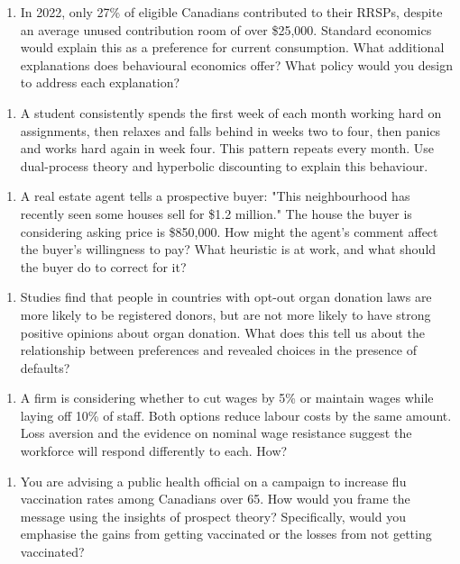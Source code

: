 \documentclass[12pt, letterpaper]{article}
\begin{document}
\begin{enumerate}
\item In 2022, only 27\% of eligible Canadians contributed to their RRSPs, despite an average unused contribution room of over \$25,000. Standard economics would explain this as a preference for current consumption. What additional explanations does behavioural economics offer? What policy would you design to address each explanation?
\end{enumerate}

\begin{enumerate}
\item A student consistently spends the first week of each month working hard on assignments, then relaxes and falls behind in weeks two to four, then panics and works hard again in week four. This pattern repeats every month. Use dual-process theory and hyperbolic discounting to explain this behaviour.
\end{enumerate}

\begin{enumerate}
\item A real estate agent tells a prospective buyer: "This neighbourhood has recently seen some houses sell for \$1.2 million." The house the buyer is considering asking price is \$850,000. How might the agent's comment affect the buyer's willingness to pay? What heuristic is at work, and what should the buyer do to correct for it?
\end{enumerate}

\begin{enumerate}
\item Studies find that people in countries with opt-out organ donation laws are more likely to be registered donors, but are not more likely to have strong positive opinions about organ donation. What does this tell us about the relationship between preferences and revealed choices in the presence of defaults?
\end{enumerate}

\begin{enumerate}
\item A firm is considering whether to cut wages by 5\% or maintain wages while laying off 10\% of staff. Both options reduce labour costs by the same amount. Loss aversion and the evidence on nominal wage resistance suggest the workforce will respond differently to each. How?
\end{enumerate}

\begin{enumerate}
\item You are advising a public health official on a campaign to increase flu vaccination rates among Canadians over 65. How would you frame the message using the insights of prospect theory? Specifically, would you emphasise the gains from getting vaccinated or the losses from not getting vaccinated?
\end{enumerate}
\end{document}
